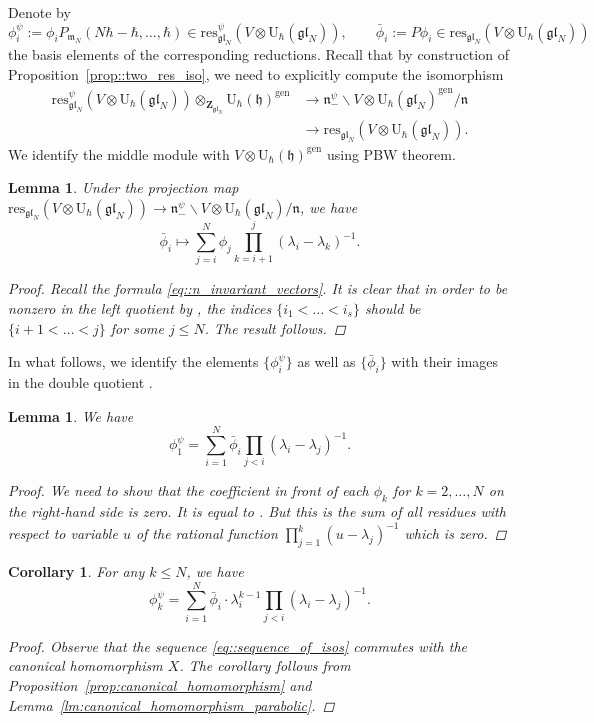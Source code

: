 \documentclass[pdftex]{sigma}
\numberwithin{equation}{section}
\newtheorem{Corollary}[Theorem]{Corollary}
\newtheorem{Lemma}[Theorem]{Lemma}
\newcommand{\U}{\mathrm{U}_{\hbar}}
\newcommand{\Z}{\mathbf{Z}}
\newcommand{\h}{\mathfrak{h}}
\newcommand{\n}{\mathfrak{n}}
\newcommand{\m}{\mathfrak{m}}
\newcommand{\gen}{\mathrm{gen}}
\newcommand{\res}{\mathrm{res}}
\newcommand{\gl}{\mathfrak{gl}}
\begin{document}
	Denote by
	\[
	\phi_i^{\psi} := \phi_i P_{\m_N}(N\hbar-\hbar,\dots,\hbar) \in \res^{\psi}_{\gl_N}(V \otimes \U(\gl_N)), \qquad \bar{\phi}_i := P \phi_i \in \res_{\gl_N}(V \otimes \U(\gl_N))
	\]
	the basis elements of the corresponding reductions. Recall that by construction of Proposition~\ref{prop::two_res_iso}, we need to explicitly compute the isomorphism
	\begin{align}
		\res^{\psi}_{\gl_N}(V \otimes \U(\gl_N)) \otimes_{\Z_{\gl_N}} \U(\h)^{\gen}& \rightarrow \n_-^{\psi} \backslash V \otimes \U(\gl_N)^{\gen} / \n\nonumber \\
&\rightarrow \res_{\gl_N}(V \otimes \U(\gl_N)).\label{eq::sequence_of_isos}
	\end{align}
	We identify the middle module with $V \otimes \U(\h)^{\gen}$ using PBW theorem.
	
	\begin{Lemma}
		Under the projection map $\res_{\gl_N}(V \otimes \U(\gl_N)) \rightarrow \n_-^{\psi} \backslash V \otimes \U(\gl_N) / \n$, we have
		\[
		\bar{\phi}_i \mapsto \sum\limits_{j=i}^{N} \phi_j \prod_{k=i+1}^j (\lambda_i-\lambda_k)^{-1}.
		\]
		\begin{proof}
			Recall the formula \eqref{eq::n_invariant_vectors}. It is clear that in order to be nonzero in the left quotient by \smash{$\n_-^{\psi}$}, the indices $\{i_1 < \dots < i_s\}$ should be $\{i+1 < \dots < j\}$ for some $j \leq N$. The result follows.
		\end{proof}
	\end{Lemma}
	
	In what follows, we identify the elements $\bigl\{\phi_i^{\psi}\bigr\}$ as well as $\bigl\{\bar{\phi}_i\bigr\}$ with their images in the double quotient \smash{$\n_-^{\psi} \backslash V \otimes \U(\gl_N) /\n$}.
	
	\begin{Lemma}
		We have
		\[
		\phi_1^{\psi} = \sum\limits_{i=1}^N \bar{\phi}_i \prod_{j<i} (\lambda_i - \lambda_j)^{-1}.
		\]
		\begin{proof}
			We need to show that the coefficient in front of each $\phi_k$ for $k=2,\dots,N$ on the right-hand side is zero. It is equal to . But this is the sum of all residues with respect to variable $u$ of the rational function $\prod_{j=1}^k (u-\lambda_j)^{-1}$ which is zero.
		\end{proof}
	\end{Lemma}
	
	\begin{Corollary}
		For any $k\leq N$, we have
		\[
		\phi_k^{\psi} = \sum\limits_{i=1}^N \bar{\phi}_i \cdot \lambda_i^{k-1} \prod_{j<i} (\lambda_i - \lambda_j)^{-1}.
		\]
		\begin{proof}
			Observe that the sequence \eqref{eq::sequence_of_isos} commutes with the canonical homomorphism $X$. The corollary follows from Proposition~\ref{prop:canonical_homomorphism} and Lemma~\ref{lm:canonical_homomorphism_parabolic}.
		\end{proof}
	\end{Corollary}
	
\end{document}
